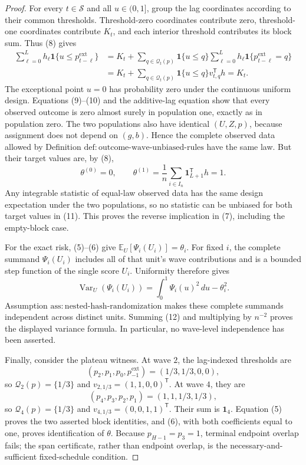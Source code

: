 \documentclass{article}
\begin{document}
\begin{proof}
For every \(t\in\mathcal S\) and all \(u\in(0,1]\), group the lag coordinates according to their common thresholds.  Threshold-zero coordinates contribute zero, threshold-one coordinates contribute \(K_t\), and each interior threshold contributes its block sum.  Thus (8) gives
\[
 \begin{aligned}
 \sum_{\ell=0}^{L}h_\ell\mathbf 1\{u\le p^{\mathrm{ext}}_{t-\ell}\}
 &=K_t+
   \sum_{q\in\mathcal Q_t(p)}
      \mathbf 1\{u\le q\}
      \sum_{\ell=0}^{L}h_\ell
      \mathbf 1\{p^{\mathrm{ext}}_{t-\ell}=q\}\\
 &=K_t+
   \sum_{q\in\mathcal Q_t(p)}
      \mathbf 1\{u\le q\}v_{t,q}^{\mathsf T}h
 =K_t.
 \end{aligned}
\tag{10}
\]
The exceptional point \(u=0\) has probability zero under the continuous uniform design.  Equations (9)--(10) and the additive-lag equation show that every observed outcome is zero almost surely in population one, exactly as in population zero.  The two populations also have identical \((U,Z,p)\), because assignment does not depend on \((g,b)\).  Hence the complete observed data allowed by Definition \(\mathrm{def:outcome\text{-}wave\text{-}unbiased\text{-}rules}\) have the same law.  But their target values are, by (8),
\[
 \theta^{(0)}=0,
 \qquad
 \theta^{(1)}=\frac1n\sum_{i\in I_n}\mathbf 1_{L+1}^{\mathsf T}h=1.
\tag{11}
\]
Any integrable statistic of equal-law observed data has the same design expectation under the two populations, so no statistic can be unbiased for both target values in (11).  This proves the reverse implication in (7), including the empty-block case.

For the exact risk, (5)--(6) give \(\mathbb E_U[\Psi_i(U_i)]=\theta_i\).  For fixed \(i\), the complete summand \(\Psi_i(U_i)\) includes all of that unit's wave contributions and is a bounded step function of the single score \(U_i\).  Uniformity therefore gives
\[
 \operatorname{Var}_U(\Psi_i(U_i))
 =\int_0^1\Psi_i(u)^2\,du-\theta_i^2.
\tag{12}
\]
Assumption \(\mathrm{ass:nested\text{-}hash\text{-}randomization}\) makes these complete summands independent across distinct units.  Summing (12) and multiplying by \(n^{-2}\) proves the displayed variance formula.  In particular, no wave-level independence has been asserted.

Finally, consider the plateau witness.  At wave \(2\), the lag-indexed thresholds are
\[
 (p_2,p_1,p_0,p^{\mathrm{ext}}_{-1})=(1/3,1/3,0,0),
\]
so \(\mathcal Q_2(p)=\{1/3\}\) and \(v_{2,1/3}=(1,1,0,0)^{\mathsf T}\).  At wave \(4\), they are
\[
 (p_4,p_3,p_2,p_1)=(1,1,1/3,1/3),
\]
so \(\mathcal Q_4(p)=\{1/3\}\) and \(v_{4,1/3}=(0,0,1,1)^{\mathsf T}\).  Their sum is \(\mathbf 1_4\).  Equation (5) proves the two asserted block identities, and (6), with both coefficients equal to one, proves identification of \(\theta\).  Because \(p_{H-1}=p_3=1\), terminal endpoint overlap fails; the span certificate, rather than endpoint overlap, is the necessary-and-sufficient fixed-schedule condition.
\end{proof}
\end{document}

